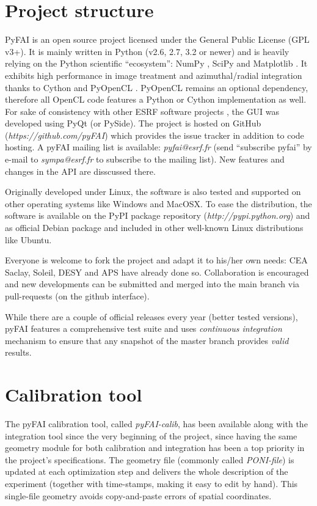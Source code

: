 \documentclass{iucr}
\begin{document}


\appendix
\section{Project structure}

PyFAI is an open source project licensed under the General Public License (GPL
v3+).
It is mainly written in Python (v2.6, 2.7, 3.2 or newer) and is
heavily relying on the Python scientific ``ecosystem'': NumPy \cite{numpy}, 
SciPy \cite{scipy} and Matplotlib \cite{matplotlib}.
It exhibits high performance in image treatment and azimuthal/radial integration
thanks to Cython \cite{cython} and PyOpenCL \cite{pyopencl}.
PyOpenCL remains an optional dependency, therefore all OpenCL code features a
Python or Cython implementation as well.
For sake of consistency with other ESRF software projects \cite{pymca}, the
GUI was developed using PyQt (or PySide).
The project is hosted on GitHub (\textit{https://github.com/pyFAI}) which
provides the issue tracker in addition to code hosting.
A pyFAI mailing list is
available: \textit{pyfai@esrf.fr} (send ``subscribe pyfai'' by e-mail to
\textit{sympa@esrf.fr} to subscribe to the mailing list). New features
and changes in the API are disscussed there.

Originally developed under Linux, the software is also tested and supported on
other operating systems like Windows and MacOSX.
To ease the distribution, the software is available on the PyPI package
repository (\textit{http://pypi.python.org}) and as official Debian package and
included in other well-known Linux distributions like Ubuntu.

Everyone is welcome to fork the project and adapt it to his/her own needs:
CEA Saclay, Soleil, DESY and APS have already done so.
Collaboration is encouraged and new developments can be submitted and merged
into the main branch via pull-requests (on the github interface).

While there are a couple of official releases every year (better
tested versions), pyFAI features a comprehensive test suite and uses
\textit{continuous integration} mechanism to ensure that any snapshot of the
master branch provides \textit{valid} results.

\section{Calibration tool}
\label{annex_calib}

The pyFAI calibration tool, called \textit{pyFAI-calib}, has been available
along with the integration tool since the very beginning of the project, 
since having the same geometry module for both calibration and integration 
has been a top priority in the project's specifications.
The geometry file (commonly called \textit{PONI-file}) is updated at each
optimization step and delivers the whole description of the experiment
(together with time-stamps, making it easy to edit by hand).
This single-file geometry avoids copy-and-paste errors of spatial coordinates.
\end{document}
